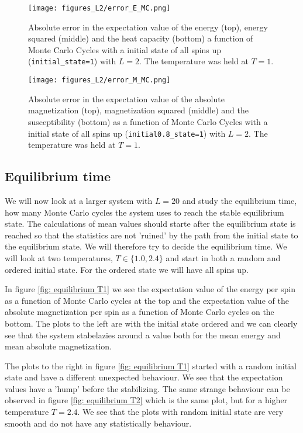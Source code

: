 \documentclass[11pt,a4wide]{article}
\begin{document}
\begin{figure}[htp]
\centering
\texttt{[image: figures\_L2/error\_E\_MC.png]}
\caption{Absolute error in the expectation value of the energy (top), energy squared (middle) and the heat capacity (bottom) a function of Monte Carlo Cycles with a initial state of all spins up (\texttt{initial\_state=1}) with $L=2$. The temperature was held at $T=1$. }
\label{fig: error E}
\end{figure}

\begin{figure}[htp]
\centering
\texttt{[image: figures\_L2/error\_M\_MC.png]}
\caption{Absolute error in the expectation value of the absolute magnetization (top), magnetization squared (middle) and the susceptibility (bottom) as a function of Monte Carlo Cycles with a initial state of all spins up (\texttt{initial0.8\_state=1}) with $L=2$. The temperature was held at $T=1$. }
\label{fig: error M}
\end{figure}

\subsection{Equilibrium time}
We will now look at a larger system with $L=20$ and study the equilibrium time, how many Monte Carlo cycles the system uses to reach the stable equilibrium state. The calculations of mean values should starte after the equilibrium state is reached so that the statistics are not 'ruined' by the path from the initial state to the equilibrium state. We will therefore try to decide the equilibrium time. We will look at two temperatures, $T\in \{1.0, 2.4\}$ and start in both a random and ordered initial state. For the ordered state we will have all spins up. 

In figure \ref{fig: equilibrium T1} we see the expectation value of the energy per spin as a function of Monte Carlo cycles at the top and the expectation value of the absolute magnetization per spin as a function of Monte Carlo cycles on the bottom. The plots to the left are with the initial state ordered and we can clearly see that the system stabelazies around a value both for the mean energy and mean absolute magnetization. 

The plots to the right in figure \ref{fig: equilibrium T1} started with a random initial state and have a different unexpected behaviour. We see that the expectation values have a 'hump' before the stabilizing. The same strange behaviour can be observed in figure \ref{fig: equilibrium T2} which is the same plot, but for a higher temperature $T=2.4$. We see that the plots with random initial state are very smooth and do not have any statistically behaviour. 
\end{document}
